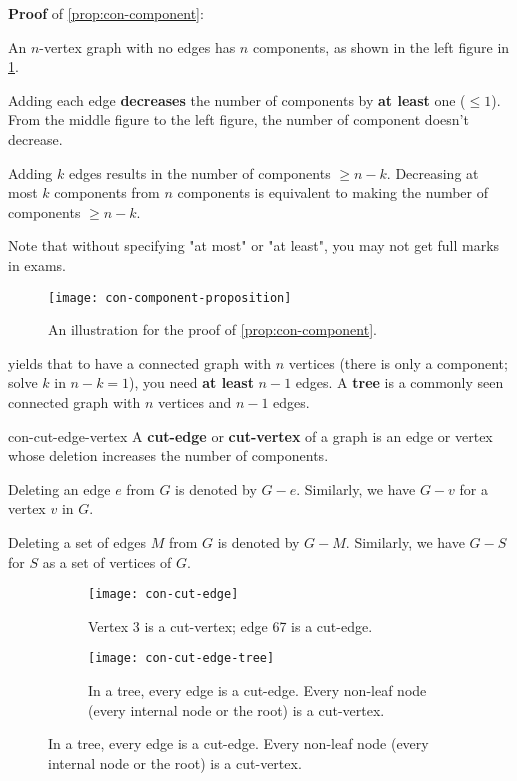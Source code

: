 \documentclass[../src/handouts/main.tex]{subfiles}
\begin{document}
\textbf{Proof} of \cref{prop:con-component}:
\begin{enumerate*}
  \item An $n$-vertex graph with no edges has $n$ components, as shown in the left figure in \cref{fig:con-component-proposition}.
  \item Adding each edge \textbf{decreases} the number of components by \textbf{at least} one ($\leq 1$). From the middle figure to the left figure, the number of component doesn't decrease.
  \item Adding $k$ edges results in the number of components $\geq n - k$. Decreasing at most $k$ components from $n$ components is equivalent to making the number of components $\geq n - k$.
  \item Note that without specifying "at most" or "at least", you may not get full marks in exams.
\end{enumerate*}

\begin{figure}[htbp]
  \centering
  \texttt{[image: con-component-proposition]}
  \caption{An illustration for the proof of \cref{prop:con-component}.}
  \label{fig:con-component-proposition}
\end{figure}

 yields that to have a connected graph with $n$ vertices (there is only a component; solve $k$ in $n - k = 1$), you need \textbf{at least} $n - 1$ edges. A \textbf{tree} is a commonly seen connected graph with $n$ vertices and $n - 1$ edges.

\begin{definition}{}{con-cut-edge-vertex}
  A \textbf{cut-edge} or \textbf{cut-vertex} of a graph is an edge or vertex whose deletion increases the number of components.

  Deleting an edge $e$ from $G$ is denoted by $G - e$.
  Similarly, we have $G - v$ for a vertex $v$ in $G$.

  Deleting a set of edges $M$ from $G$ is denoted by $G - M$.
  Similarly, we have $G - S$ for $S$ as a set of vertices of $G$.
\end{definition}

\begin{figure}[htbp]
  \centering
  \begin{subfigure}[t]{.3\textwidth}
    \centering
    \texttt{[image: con-cut-edge]}
    \caption{Vertex 3 is a cut-vertex; edge 67 is a cut-edge.}
    \label{fig:con-cut-edge}
  \end{subfigure}
  \hspace{.2\textwidth}
  \begin{subfigure}[t]{.4\textwidth}
    \centering
    \texttt{[image: con-cut-edge-tree]}
    \caption{In a tree, every edge is a cut-edge. Every non-leaf node (every internal node or the root) is a cut-vertex.}
    \label{fig:con-cut-edge-tree}
  \end{subfigure}
\end{figure}
\end{document}
